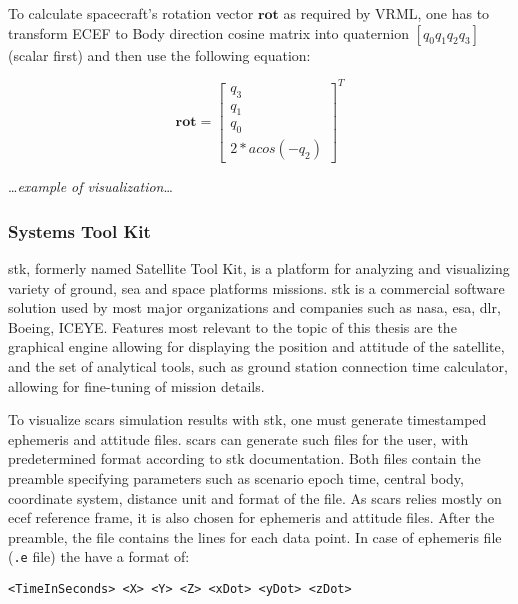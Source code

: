         To calculate spacecraft's rotation vector $\textbf{rot}$ as required by VRML, one has to transform ECEF to Body direction cosine matrix into quaternion $[q_0 q_1 q_2 q_3]$ (scalar first) and then use the following equation:

        \begin{equation}
            \textbf{rot}=
            \begin{bmatrix}
                q_3\\
                q_1\\
                q_0\\
                2*acos(-q_2)
            \end{bmatrix}^T
        \end{equation}

        \dots\textit{example of visualization}\dots
        

    \subsubsection{Systems Tool Kit}
        \ac{stk}, formerly named Satellite Tool Kit, is a platform for analyzing and visualizing variety of ground, sea and space platforms missions. \ac{stk} is a commercial software solution used by most major organizations and companies such as \ac{nasa}, \ac{esa}, \ac{dlr}, Boeing, ICEYE. Features most relevant to the topic of this thesis are the graphical engine allowing for displaying the position and attitude of the satellite, and the set of analytical tools, such as ground station connection time calculator, allowing for fine-tuning of mission details.

        To visualize \ac{scars} simulation results with \ac{stk}, one must generate timestamped ephemeris and attitude files. \ac{scars} can generate such files for the user, with predetermined format according to \ac{stk} documentation\cite{stkephemeris}. Both files contain the preamble specifying parameters such as scenario epoch time, central body, coordinate system, distance unit and format of the file. As \ac{scars} relies mostly on \ac{ecef} reference frame, it is also chosen for ephemeris and attitude files. After the preamble, the file contains the lines for each data point. In case of ephemeris file  (\verb|.e| file) the have a format of:

        \begin{Verbatim}[fontsize=\small]
<TimeInSeconds> <X> <Y> <Z> <xDot> <yDot> <zDot>
        \end{Verbatim}

